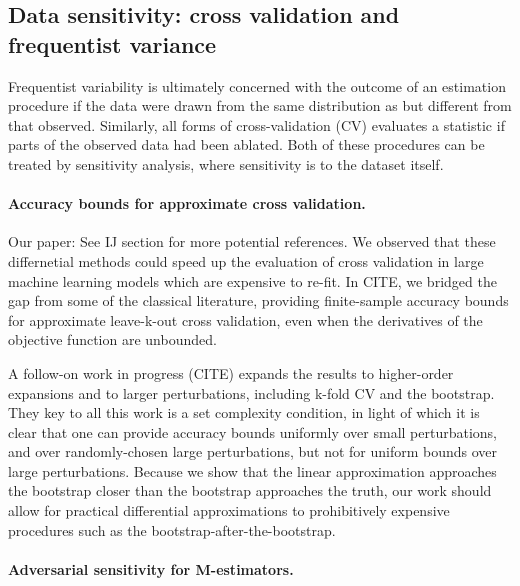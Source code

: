 \subsection*{Data sensitivity: cross validation and frequentist variance}

Frequentist variability is ultimately concerned with the outcome of an
estimation procedure if the data were drawn from the same distribution as but
different from that observed.  Similarly, all forms of cross-validation (CV)
evaluates a statistic if parts of the observed data had been ablated.  Both of
these procedures can be treated by sensitivity analysis, where sensitivity
is to the dataset itself.


\paragraph{Accuracy bounds for approximate cross validation.}

Our paper: \citet{giordano:2019:ij}
See IJ section for more potential references.
We observed that these differnetial methods could speed up the evaluation of
cross validation in large machine learning models which are expensive to re-fit.
In CITE, we bridged the gap from some of the classical literature, providing
finite-sample accuracy bounds for approximate leave-k-out cross validation, even
when the derivatives of the objective function are unbounded.

A follow-on work in progress (CITE) expands the results to higher-order
expansions and to larger perturbations, including k-fold CV and the bootstrap.
They key to all this work is a set complexity condition, in light of which it is
clear that one can provide accuracy bounds uniformly over small perturbations,
and over randomly-chosen large perturbations, but not for uniform bounds over
large perturbations.  Because we show that the linear approximation approaches
the bootstrap closer than the bootstrap approaches the truth, our work
should allow for practical differential approximations to prohibitively
expensive procedures such as the bootstrap-after-the-bootstrap.
\citet{giordano2019:hoij}
\citet{efron:1994:bootstrap}
\citet{hall:2013:bootstrap}


\paragraph{Adversarial sensitivity for M-estimators.}

